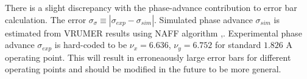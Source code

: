 There is a slight discrepancy with the phase-advance contribution to error bar calculation. 
The error $\sigma_\sigma \equiv | \sigma_{exp} - \sigma_{sim}|$. Simulated phase advance $\sigma_{sim}$ is estimated from VRUMER results using NAFF algorithm \cite{Laskar2003},\cite{Pedro2012}. Experimental phase advance $\sigma_{exp}$ is hard-coded to be $\nu_x = 6.636$, $\nu_y = 6.752$ for standard $1.826$ A operating point.  This will result in erroneaously large error bars for different operating points and should be modified in the future to be more general.










